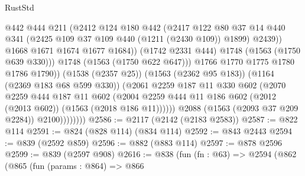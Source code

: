 \begin{lexlean}{RustStd}
\begin{coremodule}
{\begin{coremodule}
{{{{{{{{                                  @442
                                  @444
                                  @211
                                  (@2412
                                    @124
                                    @180
                                    @442
                                    (@2417
                                      @122
                                      @80
                                      @37
                                      @14
                                      @440
                                      @341
                                      (@2425 @109 @37 @109 @440 (@1211 (@2430 @109)) @1899)
                                      @2439))
                                  @1668
                                  @1671
                                  @1674
                                  @1677
                                  @1684))
                              (@1742 @2331 @444)
                              @1748
                              (@1563 (@1750 @639 @330)))
                            @1748
                            (@1563 (@1750 @622 @647)))
                          @1766
                          @1770
                          @1775
                          @1780
                          @1786
                          @1790))
                      (@1538 (@2357 @25))
                      (@1563 (@2362 @95 @183))
                      (@1164 (@2369 @183 @68 @599 @330))
                      (@2061
                        @2259
                        @187
                        @11
                        @330
                        @602
                        (@2070
                          @2259
                          @444
                          @187
                          @11
                          @602
                          (@2004
                            @2259
                            @444
                            @11
                            @186
                            @602
                            (@2012 (@2013 @602))
                            (@1563 (@2018 @186 @11))))))
                    @2088
                    (@1563 (@2093 @37 @209 @2284))
                    @2100))))))))
@2586 := @2117 (@2142 (@2183 @2583))
@2587 := @822 @114
@2591 := @824 (@828 @114) (@834 @114)
@2592 := @843 @2443
@2594 := @839 (@2592 @859)
@2596 := @882 (@883 @114)
@2597 := @878 @2596
@2599 := @839 (@2597 @908)
@2616 := @838
    (fun (fn : @63) =>
    @2594
      (@862
        (@865
          (fun (params : @864) =>
          @866
}}}}}}}}
\end{coremodule}}
\end{coremodule}
\end{lexlean}
